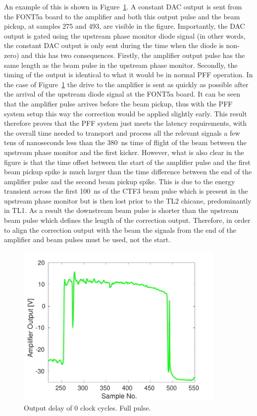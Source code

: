 An example of this is shown in Figure~\ref{f:absDelay0_all}. A constant DAC output is sent from the FONT5a board to the amplifier and both this output pulse and the beam pickup, at samples 275 and 493, are visible in the figure. Importantly, the DAC output is gated using the upstream phase monitor diode signal (in other words, the constant DAC output is only sent during the time when the diode is non-zero) and this has two consequences. Firstly, the amplifier output pulse has the same length as the beam pulse in the upstream phase monitor. Secondly, the timing of the output is identical to what it would be in normal PFF operation. In the case of Figure~\ref{f:absDelay0_all} the drive to the amplifier is sent as quickly as possible after the arrival of the upstream diode signal at the FONT5a board. It can be seen that the amplifier pulse arrives before the beam pickup, thus with the PFF system setup this way the correction would be applied slightly early. This result therefore proves that the PFF system just meets the latency requirements, with the overall time needed to transport and process all the relevant signals a few tens of nanoseconds less than the 380~ns time of flight of the beam between the upstream phase monitor and the first kicker. However, what is also clear in the figure is that the time offset between the start of the amplifier pulse and the first beam pickup spike is much larger than the time difference between the end of the amplifier pulse and the second beam pickup spike. This is due to the energy transient across the first 100~ns of the CTF3 beam pulse which is present in the upstream phase monitor but is then lost prior to the TL2 chicane, predominantly in TL1. As a result the downstream beam pulse is shorter than the upstream beam pulse which defines the length of the correction output. Therefore, in order to align the correction output with the beam the signals from the end of the amplifier and beam pulses must be used, not the start.

\begin{figure}
  \centering
  \includegraphics[width=0.9\textwidth]{Figures/commissioning/absDelay0_all}
  \caption{Output delay of 0 clock cycles. Full pulse.}
  \label{f:absDelay0_all}
\end{figure}

